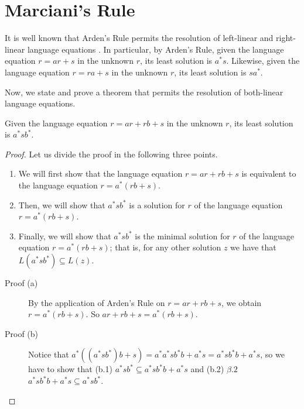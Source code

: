 \section{Marciani's Rule}
\label{sec:marciani-rule}

It is well known that Arden's Rule permits the resolution of left-linear and
right-linear language equations \cite{Pettorossi13}.
In particular, by Arden's Rule, given the language equation $r=ar+s$ in the
unknown $r$, its least solution is $a^{*}s$. Likewise, given the language
equation $r=ra+s$ in the unknown $r$, its least solution is $sa^{*}$.

Now, we state and prove a theorem that permits the resolution of both-linear
language equations.

\begin{theorem}
	\label{thm:marciani-rule}

	Given the language equation $r=ar+rb+s$ in the unknown $r$, its least
	solution is $a^{*}sb^{*}$.

	\begin{proof}
		Let us divide the proof in the following three points.

		\begin{enumerate}[label=\alph*]

			\item We will first show that the language equation $r=ar+rb+s$ is
			equivalent to the language equation $r=a^{*}(rb+s)$.

			\item Then, we will show that $a^{*}sb^{*}$ is a solution for $r$ of
			the language equation $r=a^{*}(rb+s)$.

			\item Finally, we will show that $a^{*}sb^{*}$ is the minimal
			solution for $r$ of the language equation $r=a^{*}(rb+s)$; that is,
			for	any other solution $z$ we have that
			$L(a^{*}sb^{*})\subseteq L(z)$.

		\end{enumerate}

		\begin{description}

			\item [Proof (a)] By the application of Arden's Rule on $r=ar+rb+s$, we obtain $r=a^{*}(rb+s)$.
			So $ar+rb+s=a^{*}(rb+s)$\cite{Pettorossi13}.

			\item [Proof (b)] Notice that $a^{*}((a^{*}sb^{*})b+s)=a^{*}a^{*}sb^{*}b+a^{*}s=a^{*}sb^{*}b+a^{*}s$,
			so we have to show that
			(b.1) $a^{*}sb^{*}\subseteq a^{*}sb^{*}b+a^{*}s$ and
			(b.2) $\beta.2$ $a^{*}sb^{*}b+a^{*}s\subseteq a^{*}sb^{*}$.


\end{description}
\end{proof}
\end{theorem}
